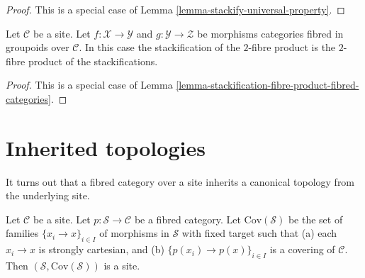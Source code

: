 \begin{proof}
This is a special case of
Lemma \ref{lemma-stackify-universal-property}.
\end{proof}

\begin{lemma}
\label{lemma-stackification-fibre-product-categories-fibred-in-groupoids}
Let $\mathcal{C}$ be a site.
Let $f : \mathcal{X} \to \mathcal{Y}$ and $g : \mathcal{Y} \to \mathcal{Z}$
be morphisms categories fibred in groupoids over $\mathcal{C}$.
In this case the stackification of the $2$-fibre product is the $2$-fibre
product of the stackifications.
\end{lemma}

\begin{proof}
This is a special case of
Lemma \ref{lemma-stackification-fibre-product-fibred-categories}.
\end{proof}









\section{Inherited topologies}
\label{section-topology}

\noindent
It turns out that a fibred category over a site inherits a canonical
topology from the underlying site.

\begin{lemma}
\label{lemma-topology-inherited}
Let $\mathcal{C}$ be a site. Let $p : \mathcal{S} \to \mathcal{C}$
be a fibred category. Let $\text{Cov}(\mathcal{S})$
be the set of families $\{x_i \to x\}_{i \in I}$ of morphisms in $\mathcal{S}$
with fixed target such that (a) each $x_i \to x$ is strongly cartesian,
and (b) $\{p(x_i) \to p(x)\}_{i \in I}$ is a covering of $\mathcal{C}$.
Then $(\mathcal{S}, \text{Cov}(\mathcal{S}))$ is a site.
\end{lemma}

